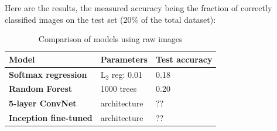 Here are the results, the measured accuracy being the fraction of correctly classified images on the test set (20\% of the total dataset):
\begin{table}[H]
\begin{center}
    \begin{tabular}{| l | l | p{5cm} |}
    \hline
    Model & Parameters & Test accuracy \\ \hline
    \textbf{Softmax regression} & $\text{L}_2$ reg: 0.01 & 0.18  \\ \hline
    \textbf{Random Forest} & 1000 trees & 0.20 \\ \hline
    \textbf{5-layer ConvNet} & architecture & ?? \\ \hline
    \textbf{Inception fine-tuned} & architecture & ?? \\
    \hline
    \end{tabular}
\end{center} 
\caption{Comparison of models using raw images}
\end{table}





